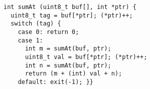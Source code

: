 \begin{lstlisting}
int sumAt (uint8_t buf[], int *ptr) {
  uint8_t tag = buf[*ptr]; (*ptr)++;
  switch (tag) {
    case 0: return 0;
    case 1:
      int m = sumAt(buf, ptr);
      uint8_t val = buf[*ptr]; (*ptr)++;
      int n = sumAt(buf, ptr);
      return (m + (int) val + n);
    default: exit(-1); }}
\end{lstlisting}
